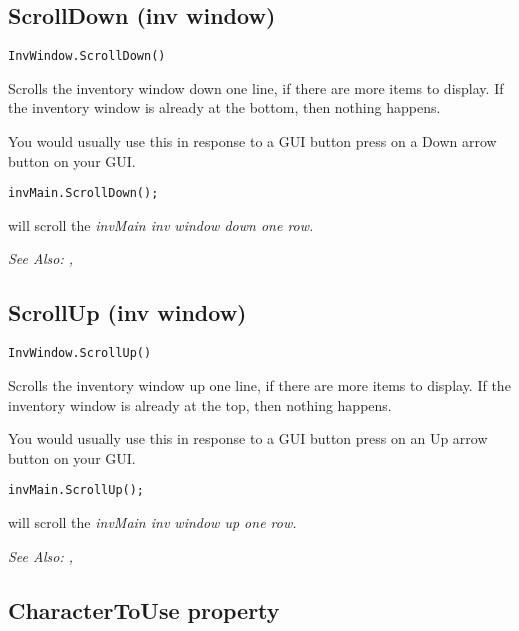 \subsection{ScrollDown (inv window)}\label{InvWindow.ScrollDown}%

\begin{verbatim}
InvWindow.ScrollDown()
\end{verbatim}
Scrolls the inventory window down one line, if there are more items to display.
If the inventory window is already at the bottom, then nothing happens.

You would usually use this in response to a GUI button press on a Down arrow button
on your GUI.

\begin{verbatim}
invMain.ScrollDown();
\end{verbatim}
will scroll the \it{invMain} inv window down one row.

\it{See Also:} ,


\subsection{ScrollUp (inv window)}\label{InvWindow.ScrollUp}%

\begin{verbatim}
InvWindow.ScrollUp()
\end{verbatim}
Scrolls the inventory window up one line, if there are more items to display.
If the inventory window is already at the top, then nothing happens.

You would usually use this in response to a GUI button press on an Up arrow button
on your GUI.

\begin{verbatim}
invMain.ScrollUp();
\end{verbatim}
will scroll the \it{invMain} inv window up one row.

\it{See Also:} ,


\subsection{CharacterToUse property}\label{InvWindow.CharacterToUse}%

